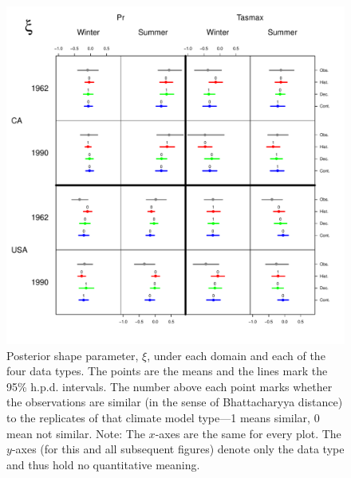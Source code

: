 \documentclass[12pt]{article}
\begin{document}
\begin{figure}
\begin{center}
\includegraphics[scale=0.72]{figs/shape.pdf}
\end{center}
\caption{Posterior shape parameter, $\xi$, under each domain and each of the four data types. The points are the means and the lines mark the 95\% h.p.d. intervals. The number above each point marks whether the observations are similar (in the sense of Bhattacharyya distance) to the replicates of that climate model type---1 means similar, 0 mean not similar. Note: The $x$-axes are the same for every plot. The $y$-axes (for this and all subsequent figures) denote only the data type and thus hold no quantitative meaning.}
\label{ksi}
\end{figure}
\end{document}
